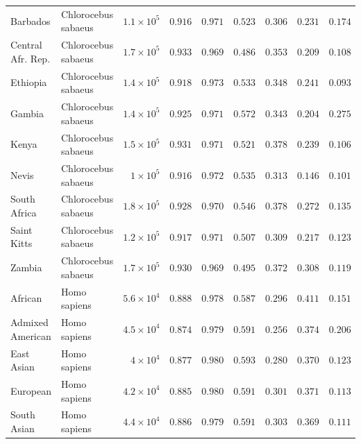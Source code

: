 \documentclass{article}
\begin{document}
\begin{center}
\begin{adjustbox}{width=\textwidth}
\begin{tabular}{||l|l|r||r|r||r|r||r|r||}
                \rowcolor{LIGHTGREY} Barbados & Chlorocebus sabaeus & $1.1\times 10^{5}$ & $ 0.916$ & $ 0.971$ & $ 0.523$ & $ 0.306$ & $ 0.231$ & $ 0.174$ \\
                \rowcolor{LIGHTGREY} Central Afr. Rep. & Chlorocebus sabaeus & $1.7\times 10^{5}$ & $ 0.933$ & $ 0.969$ & $ 0.486$ & $ 0.353$ & $ 0.209$ & $ 0.108$ \\
                \rowcolor{LIGHTGREY} Ethiopia & Chlorocebus sabaeus & $1.4\times 10^{5}$ & $ 0.918$ & $ 0.973$ & $ 0.533$ & $ 0.348$ & $ 0.241$ & $ 0.093$ \\
                \rowcolor{LIGHTGREY} Gambia & Chlorocebus sabaeus & $1.4\times 10^{5}$ & $ 0.925$ & $ 0.971$ & $ 0.572$ & $ 0.343$ & $ 0.204$ & $ 0.275$ \\
                \rowcolor{LIGHTGREY} Kenya & Chlorocebus sabaeus & $1.5\times 10^{5}$ & $ 0.931$ & $ 0.971$ & $ 0.521$ & $ 0.378$ & $ 0.239$ & $ 0.106$ \\
                \rowcolor{LIGHTGREY} Nevis & Chlorocebus sabaeus & $ 1\times 10^{5}$ & $ 0.916$ & $ 0.972$ & $ 0.535$ & $ 0.313$ & $ 0.146$ & $ 0.101$ \\
                \rowcolor{LIGHTGREY} South Africa & Chlorocebus sabaeus & $1.8\times 10^{5}$ & $ 0.928$ & $ 0.970$ & $ 0.546$ & $ 0.378$ & $ 0.272$ & $ 0.135$ \\
                \rowcolor{LIGHTGREY} Saint Kitts & Chlorocebus sabaeus & $1.2\times 10^{5}$ & $ 0.917$ & $ 0.971$ & $ 0.507$ & $ 0.309$ & $ 0.217$ & $ 0.123$ \\
                \rowcolor{LIGHTGREY} Zambia & Chlorocebus sabaeus & $1.7\times 10^{5}$ & $ 0.930$ & $ 0.969$ & $ 0.495$ & $ 0.372$ & $ 0.308$ & $ 0.119$ \\
                African & Homo sapiens & $5.6\times 10^{4}$ & $ 0.888$ & $ 0.978$ & $ 0.587$ & $ 0.296$ & $ 0.411$ & $ 0.151$ \\
                Admixed American & Homo sapiens & $4.5\times 10^{4}$ & $ 0.874$ & $ 0.979$ & $ 0.591$ & $ 0.256$ & $ 0.374$ & $ 0.206$ \\
                East Asian & Homo sapiens & $ 4\times 10^{4}$ & $ 0.877$ & $ 0.980$ & $ 0.593$ & $ 0.280$ & $ 0.370$ & $ 0.123$ \\
                European & Homo sapiens & $4.2\times 10^{4}$ & $ 0.885$ & $ 0.980$ & $ 0.591$ & $ 0.301$ & $ 0.371$ & $ 0.113$ \\
                South Asian & Homo sapiens & $4.4\times 10^{4}$ & $ 0.886$ & $ 0.979$ & $ 0.591$ & $ 0.303$ & $ 0.369$ & $ 0.111$ \\

\end{tabular}
\end{adjustbox}
\end{center}
\end{document}
